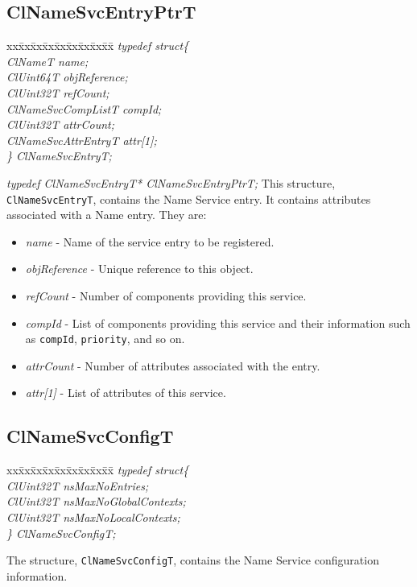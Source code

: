 \begin{flushleft}
\subsection{ClNameSvcEntryPtrT}
\begin{tabbing}
xx\=xx\=xx\=xx\=xx\=xx\=xx\=xx\=xx\=\kill
\textit{typedef struct\{}\\
\>\>\>\>\textit{ClNameT             name;}\\
\>\>\>\>\textit{ClUint64T          objReference;}\\
\>\>\>\>\textit{ClUint32T           refCount;}\\
\>\>\>\>\textit{ClNameSvcCompListT  compId;}\\
\>\>\>\>\textit{ClUint32T         attrCount;}\\
\>\>\>\>\textit{ClNameSvcAttrEntryT attr\mbox{[}1\mbox{]};}\\
\textit{\} ClNameSvcEntryT;}\end{tabbing}
\textit{typedef ClNameSvcEntryT* ClNameSvcEntryPtrT;}
\newline
\newline 
This structure, {\tt{ClNameSvcEntryT}}, contains the Name Service entry. It contains attributes associated with a Name entry. They are:
\begin{itemize}
\item
\textit{name} - Name of the service entry to be registered.
\item
\textit{objReference} - Unique reference to this object.
\item
\textit{refCount} - Number of components providing this service.
\item
\textit{compId} - List of components providing this service and their information such as {\tt{compId}}, {\tt{priority}}, and so on.
\item
\textit{attrCount} - Number of attributes associated with the entry.
\item
\textit{attr\mbox{[}1\mbox{]}} - List of attributes of this service.
\end{itemize}



\subsection{ClNameSvcConfigT}
\begin{tabbing}
xx\=xx\=xx\=xx\=xx\=xx\=xx\=xx\=xx\=\kill
\textit{typedef struct\{}\\
\>\>\>\>\textit{ClUint32T nsMaxNoEntries;}\\
\>\>\>\>\textit{ClUint32T nsMaxNoGlobalContexts;}\\
\>\>\>\>\textit{ClUint32T nsMaxNoLocalContexts;}\\
\textit{\} ClNameSvcConfigT;}\end{tabbing}
The structure, {\tt{ClNameSvcConfigT}}, contains the Name Service configuration information. 



\end{flushleft}
